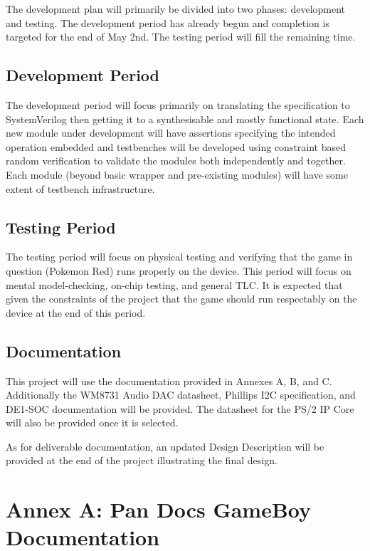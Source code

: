 \documentclass[12pt,letterpaper,titlepage, final]{report}
\begin{document}
\begin{raggedright}
The development plan will primarily be divided into two phases: development and testing. The development period has already begun and completion is targeted for the end of May 2nd. The testing period will fill the remaining time. 

\subsection{Development Period}

The development period will focus primarily on translating the specification to SystemVerilog then getting it to a synthesisable and mostly functional state. Each new module under development will have assertions specifying the intended operation embedded and testbenches will be developed using constraint based random verification to validate the modules both independently and together. Each module (beyond basic wrapper and pre-existing modules) will have some extent of testbench infrastructure.

\subsection{Testing Period} 

The testing period will focus on physical testing and verifying that the game in question (Pokemon Red) runs properly on the device. This period will focus on mental model-checking, on-chip testing, and general TLC. It is expected that given the constraints of the project that the game should run respectably on the device at the end of this period.

\subsection{Documentation}

This project will use the documentation provided in Annexes A, B, and C. Additionally the WM8731 Audio DAC datasheet, Phillips I2C specification, and DE1-SOC documentation will be provided. The datasheet for the PS/2 IP Core will also be provided once it is selected.

As for deliverable documentation, an updated Design Description will be provided at the end of the project illustrating the final design.

\clearpage

\hypertarget{annexa}{\section{Annex A: Pan Docs GameBoy Documentation}}


\end{raggedright}
\end{document}
